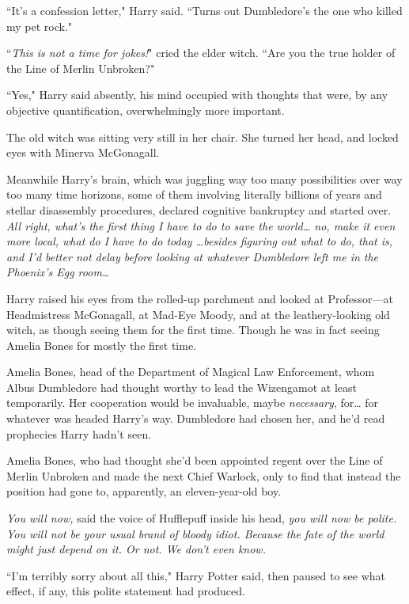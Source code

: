 ``It's a confession letter," Harry said. ``Turns out Dumbledore's the one who killed my pet rock."

``\emph{This is not a time for jokes!}" cried the elder witch. ``Are you the true holder of the Line of Merlin Unbroken?"

``Yes," Harry said absently, his mind occupied with thoughts that were, by any objective quantification, overwhelmingly more important.

The old witch was sitting very still in her chair. She turned her head, and locked eyes with Minerva McGonagall.

Meanwhile Harry's brain, which was juggling way too many possibilities over way too many time horizons, some of them involving literally billions of years and stellar disassembly procedures, declared cognitive bankruptcy and started over. \emph{All right, what's the \emph{first} thing I have to do to save the world{\ldots} no, make it even more local, what do I have to do \emph{today} {\ldots}besides figuring out what to do, that is, and I'd better not delay before looking at whatever Dumbledore left me in the Phoenix's Egg room{\ldots}}

Harry raised his eyes from the rolled-up parchment and looked at Professor---at Headmistress McGonagall, at Mad-Eye Moody, and at the leathery-looking old witch, as though seeing them for the first time. Though he was in fact seeing Amelia Bones for mostly the first time.

Amelia Bones, head of the Department of Magical Law Enforcement, whom Albus Dumbledore had thought worthy to lead the Wizengamot at least temporarily. Her cooperation would be invaluable, maybe \emph{necessary}, for{\ldots} for whatever was headed Harry's way. Dumbledore had chosen her, and he'd read prophecies Harry hadn't seen.

Amelia Bones, who had thought she'd been appointed regent over the Line of Merlin Unbroken and made the next Chief Warlock, only to find that instead the position had gone to, apparently, an eleven-year-old boy.

\emph{You will now,} said the voice of Hufflepuff inside his head, \emph{you will now be polite. You will not be your usual brand of bloody idiot. Because the fate of the world might just depend on it. Or not. We don't even know.}

``I'm terribly sorry about all this," Harry Potter said, then paused to see what effect, if any, this polite statement had produced.

